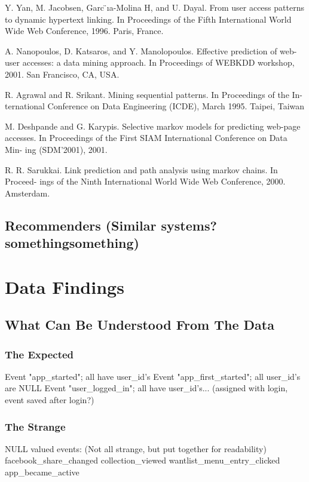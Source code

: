 Y. Yan, M. Jacobsen, Garc ̈ıa-Molina H, and U. Dayal. From user access patterns to
dynamic hypertext linking. In Proceedings of the Fifth International World Wide
Web Conference, 1996. Paris, France.

A. Nanopoulos, D. Katsaros, and Y. Manolopoulos. Effective prediction of web-
user accesses: a data mining approach. In Proceedings of WEBKDD workshop,
2001. San Francisco, CA, USA.

R. Agrawal and R. Srikant. Mining sequential patterns. In Proceedings of the In-
ternational Conference on Data Engineering (ICDE), March 1995. Taipei, Taiwan

M. Deshpande and G. Karypis. Selective markov models for predicting web-page
accesses. In Proceedings of the First SIAM International Conference on Data Min-
ing (SDM’2001), 2001.

R. R. Sarukkai. Link prediction and path analysis using markov chains. In Proceed-
ings of the Ninth International World Wide Web Conference, 2000. Amsterdam.



\subsection{Recommenders (Similar systems? somethingsomething)}

\section{Data Findings}
\subsection{What Can Be Understood From The Data}
\subsubsection{The Expected}
Event "app_started"; all have user_id's
Event "app_first_started"; all user_id's are NULL
Event "user_logged_in"; all have user_id's... (assigned with login, event saved after login?)

\subsubsection{The Strange}
NULL valued events: (Not all strange, but put together for readability)
facebook_share_changed
collection_viewed
wantlist_menu_entry_clicked
app_became_active

